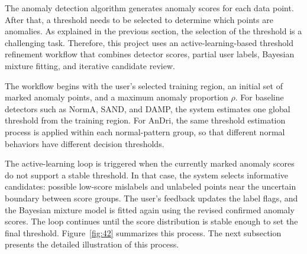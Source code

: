 The anomaly detection algorithm generates anomaly scores for each data point. After that, a threshold needs to be selected to determine which points are anomalies. As explained in the previous section, the selection of the threshold is a challenging task. Therefore, this project uses an active-learning-based threshold refinement workflow that combines detector scores, partial user labels, Bayesian mixture fitting, and iterative candidate review. 

The workflow begins with the user's selected training region, an initial set of marked anomaly points, and a maximum anomaly proportion \(\rho\). For baseline detectors such as NormA, SAND, and DAMP, the system estimates one global threshold from the training region. For AnDri, the same threshold estimation process is applied within each normal-pattern group, so that different normal behaviors have different decision thresholds. 


The active-learning loop is triggered when the currently marked anomaly scores do not support a stable threshold. In that case, the system selects informative candidates: possible low-score mislabels and unlabeled points near the uncertain boundary between score groups. The user's feedback updates the label flags, and the Bayesian mixture model is fitted again using the revised confirmed anomaly scores. The loop continues until the score distribution is stable enough to set the final threshold. Figure~\ref{fig:42} summarizes this process. The next subsection presents the detailed illustration of this process.

